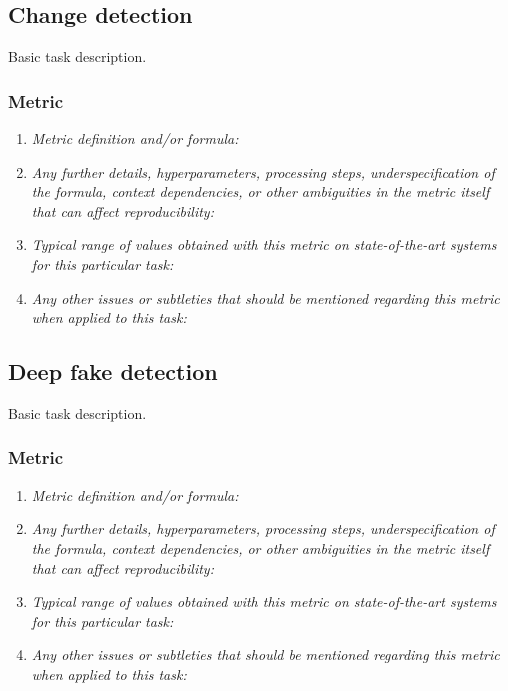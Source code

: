 \documentclass[a4paper,11pt]{article}
\begin{document}
    \subsection{Change detection}
        Basic task description.
        \subsubsection{Metric}
            \begin{enumerate}[label=\alph*.]
                \item \textit{Metric definition and/or formula:}
                \bigskip
                \item \textit{Any further details, hyperparameters, processing steps, underspecification of the formula, context dependencies, or other ambiguities in the metric itself that can affect reproducibility:}
                \bigskip
                \item \textit{Typical range of values obtained with this metric on state-of-the-art systems for this particular task:}
                \bigskip
                \item \textit{Any other issues or subtleties that should be mentioned regarding this metric when applied to this task:}
                \bigskip
            \end{enumerate}

    \subsection{Deep fake detection}
        Basic task description.
        \subsubsection{Metric}
            \begin{enumerate}[label=\alph*.]
                \item \textit{Metric definition and/or formula:}
                \bigskip
                \item \textit{Any further details, hyperparameters, processing steps, underspecification of the formula, context dependencies, or other ambiguities in the metric itself that can affect reproducibility:}
                \bigskip
                \item \textit{Typical range of values obtained with this metric on state-of-the-art systems for this particular task:}
                \bigskip
                \item \textit{Any other issues or subtleties that should be mentioned regarding this metric when applied to this task:}
                \bigskip
            \end{enumerate}
\end{document}
